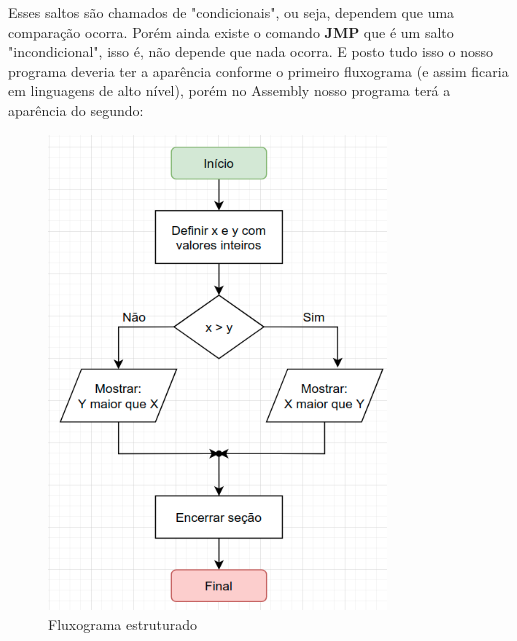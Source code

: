 Esses saltos são chamados de "condicionais", ou seja, dependem que uma comparação ocorra. Porém ainda existe o comando \textbf{JMP} que é um salto "incondicional", isso é, não depende que nada ocorra. E posto tudo isso o nosso programa deveria ter a aparência conforme o primeiro fluxograma (e assim ficaria em linguagens de alto nível), porém no Assembly nosso programa terá a aparência do segundo:
\begin{figure}[ht]
	\begin{minipage}[b]{0.45\linewidth}
		\centering
		\includegraphics[width=0.80\textwidth]{Pictures/cap01/programa3a}
		\caption{Fluxograma estruturado}
	\end{minipage}
	\hspace{0.5cm}
	\begin{minipage}[b]{0.45\linewidth}
		\centering

\end{minipage}
\end{figure}

